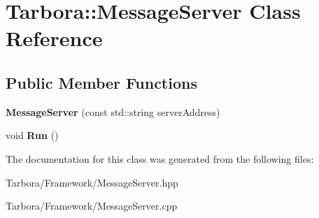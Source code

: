 \hypertarget{classTarbora_1_1MessageServer}{}\section{Tarbora\+:\+:Message\+Server Class Reference}
\label{classTarbora_1_1MessageServer}
\subsection*{Public Member Functions}
\begin{DoxyCompactItemize}
\item 
\mbox{\label{classTarbora_1_1MessageServer_a9d2229ceb2c4394d1b6db5b6b0c6ce4b}} 
{\bfseries Message\+Server} (const std\+::string server\+Address)
\item 
\mbox{\label{classTarbora_1_1MessageServer_a7fb351b64d4cb78b32ae460ee1725542}} 
void {\bfseries Run} ()
\end{DoxyCompactItemize}


The documentation for this class was generated from the following files\+:\begin{DoxyCompactItemize}
\item 
Tarbora/\+Framework/Message\+Server.\+hpp\item 
Tarbora/\+Framework/Message\+Server.\+cpp\end{DoxyCompactItemize}
